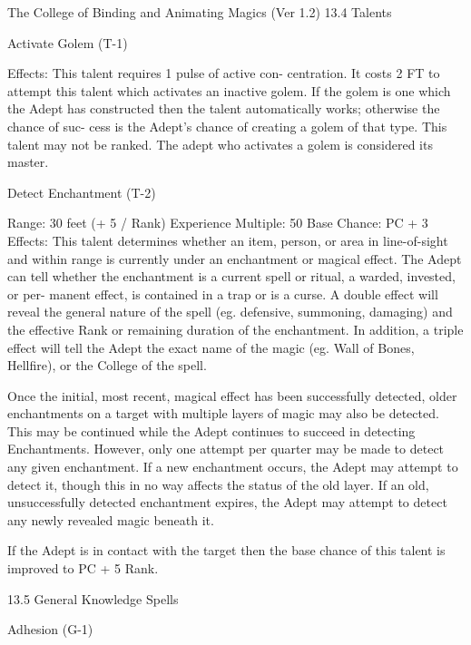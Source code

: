 \begin{Chapter}{The College of Binding and Animating Magics (Ver 1.2)}
13.4 Talents 

Activate Golem (T-1) 

Effects:  This  talent  requires  1  pulse  of  active  con-
centration. It costs 2 FT to attempt this talent which 
activates  an  inactive  golem.  If  the  golem  is  one 
which  the  Adept  has  constructed  then  the  talent 
automatically  works;  otherwise  the  chance  of  suc-
cess  is  the  Adept’s  chance  of  creating  a  golem  of 
that type. This talent may not be ranked. The adept 
who activates a golem is considered its master. 

Detect Enchantment (T-2) 

Range: 30 feet (+ 5 / Rank) 
Experience Multiple: 50 
Base Chance: PC + 3%
Effects:  This  talent  determines  whether  an  item, 
person, or area in line-of-sight and within range is 
currently  under  an  enchantment  or  magical  effect. 
The  Adept  can  tell  whether  the  enchantment  is  a 
current  spell  or  ritual,  a  warded,  invested,  or  per-
manent effect, is contained in a trap or is a curse. A 
double  effect  will  reveal  the  general  nature  of  the 
spell  (eg.  defensive,  summoning,  damaging)  and 
the  effective  Rank  or  remaining  duration  of  the 
enchantment. In addition, a triple effect will tell the 
Adept  the  exact  name  of  the  magic  (eg.  Wall  of 
Bones, Hellfire), or the College of the spell. 

Once  the  initial,  most  recent,  magical  effect  has 
been  successfully  detected,  older  enchantments  on 
a target with multiple layers of magic may also be 
detected.  This  may  be  continued  while  the  Adept 
continues  to  succeed  in  detecting  Enchantments. 
However,  only  one  attempt  per  quarter  may  be 
made  to  detect  any  given  enchantment.  If  a  new 
enchantment  occurs,  the  Adept  may  attempt  to 
detect it, though this in no way affects the status of 
the  old  layer.  If  an  old,  unsuccessfully  detected 
enchantment  expires,  the  Adept  may  attempt  to 
detect any newly revealed magic beneath it. 

If  the  Adept  is  in  contact  with  the  target  then  the 
base chance of this talent is improved to PC + 5%
Rank. 

13.5 General Knowledge Spells 

Adhesion (G-1) 


\end{Chapter}
